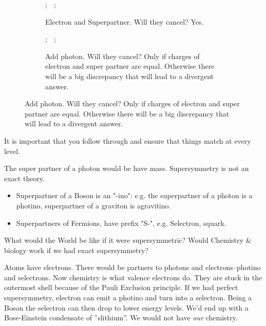 \documentclass[]{article}
\begin{document}
\begin{figure}[H]
	\caption{Is the coupling constant stopping us from seeing superpartners?}
	\begin{subfigure}[t]{0.45\textwidth}
		\caption{Electron and Superpartner. Will they cancel? Yes.}\label{fig:particles3-2-2loops}
			;
		$\;$
		;
	\end{subfigure}
	\hfill
	\begin{subfigure}[t]{0.45\textwidth}
		\caption{Add photon. Will they cancel? Only if charges of electron and super partner are equal. Otherwise there will be a big discrepancy that will lead to a divergent answer.}\label{fig:particles3-2-2loops-photons}
			;
		$\;$
		;
	\end{subfigure}
\end{figure}

It is important that you follow through and ensure that things match at every level.

The super partner of a photon would be have mass. Supersymmetry is not an exact theory.

\begin{itemize}
	\item Superpartner of a Boson is an "-ino": e.g. the superpartner of a photon is a photino, superpartner of a graviton is agravitino.
	\item Superpartners of Fermions, have prefix "S-", e.g. Selectron, squark.
\end{itemize}

What would the World be like if it were supersymmetric? Would Chemistry \& biology work if we had exact supersymmetry?

Atoms have electrons. There would be partners to photons and electrons--photino and selectrons. Now chemistry is what valence electrons do. They are stuck in the outermost shell because of the Pauli Exclusion principle. If we had perfect supersymmetry, electron can emit a photino and turn into a selectron. Being a Boson the selectron can then drop to lower energy levels. We'd end up with a Bose-Einstein condensate of ''slithium''. We would not have \emph{our} chemistry.
\end{document}
